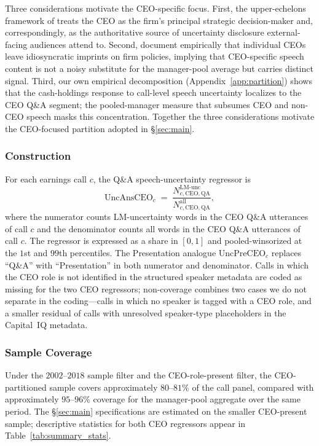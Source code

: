 Three considerations motivate the CEO-specific focus. First, the upper-echelons framework of  treats the CEO as the firm's principal strategic decision-maker and, correspondingly, as the authoritative source of uncertainty disclosure external-facing audiences attend to. Second,  document empirically that individual CEOs leave idiosyncratic imprints on firm policies, implying that CEO-specific speech content is not a noisy substitute for the manager-pool average but carries distinct signal. Third, our own empirical decomposition (Appendix~\ref{app:partition}) shows that the cash-holdings response to call-level speech uncertainty localizes to the CEO Q\&A segment; the pooled-manager measure that subsumes CEO and non-CEO speech masks this concentration. Together the three considerations motivate the CEO-focused partition adopted in \S\ref{sec:main}.

\subsubsection{Construction}

For each earnings call $c$, the Q\&A speech-uncertainty regressor is
\[
\text{UncAnsCEO}_c \;=\; \frac{N^{\text{LM-unc}}_{c,\text{CEO},\text{QA}}}{N^{\text{all}}_{c,\text{CEO},\text{QA}}},
\]
where the numerator counts LM-uncertainty words in the CEO Q\&A utterances of call $c$ and the denominator counts all words in the CEO Q\&A utterances of call $c$. The regressor is expressed as a share in $[0,1]$ and pooled-winsorized at the $1$st and $99$th percentiles. The Presentation analogue $\text{UncPreCEO}_c$ replaces ``Q\&A'' with ``Presentation'' in both numerator and denominator. Calls in which the CEO role is not identified in the structured speaker metadata are coded as missing for the two CEO regressors; non-coverage combines two cases we do not separate in the coding---calls in which no speaker is tagged with a CEO role, and a smaller residual of calls with unresolved speaker-type placeholders in the Capital~IQ metadata.

\subsubsection{Sample Coverage}

Under the $2002$--$2018$ sample filter and the CEO-role-present filter, the CEO-partitioned sample covers approximately $80$--$81\%$ of the call panel, compared with approximately $95$--$96\%$ coverage for the manager-pool aggregate over the same period. The \S\ref{sec:main} specifications are estimated on the smaller CEO-present sample; descriptive statistics for both CEO regressors appear in Table~\ref{tab:summary_stats}.

